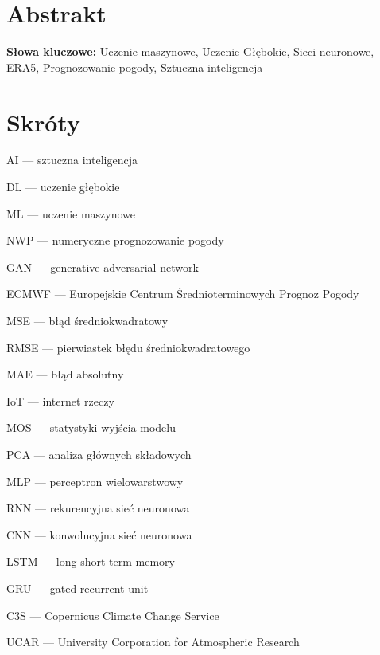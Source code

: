 \documentclass{article}
\begin{document}

\begin{titlepage}
    
\end{titlepage}

\tableofcontents
\pagebreak

\section*{Abstrakt}

\noindent
{\bf Słowa kluczowe:} Uczenie maszynowe, Uczenie Głębokie, Sieci neuronowe,
ERA5, Prognozowanie pogody, Sztuczna inteligencja
\pagebreak



% 



% 


\section*{Skróty}

\raggedright{}

AI — sztuczna inteligencja

DL — uczenie głębokie

ML — uczenie maszynowe

NWP — numeryczne prognozowanie pogody

GAN — generative adversarial network

ECMWF — Europejskie Centrum Średnioterminowych Prognoz Pogody

MSE — błąd średniokwadratowy

RMSE — pierwiastek błędu średniokwadratowego

MAE — błąd absolutny

IoT — internet rzeczy

MOS — statystyki wyjścia modelu

PCA — analiza głównych składowych

MLP — perceptron wielowarstwowy

RNN — rekurencyjna sieć neuronowa

CNN — konwolucyjna sieć neuronowa

LSTM — long-short term memory

GRU — gated recurrent unit

C3S — Copernicus Climate Change Service

UCAR — University Corporation for Atmospheric Research

\pagebreak
\printbibliography[title={Bibliografia}]

\end{document}
